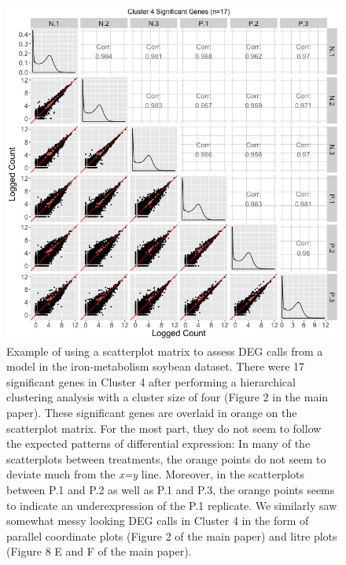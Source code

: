 \documentclass{article}
\begin{document}
  \clearpage
  \null
  \begin{figure}[t!]
  \centerline{\includegraphics[width=\columnwidth]{../MakeFigures/sbIRClusterSigSM4.jpg}}
  \caption{Example of using a scatterplot matrix to assess DEG calls from a model in the iron-metabolism soybean dataset. There were 17 significant genes in Cluster 4 after performing a hierarchical clustering analysis with a cluster size of four (Figure 2 in the main paper). These significant genes are overlaid in orange on the scatterplot matrix. For the most part, they do not seem to follow the expected patterns of differential expression: In many of the scatterplots between treatments, the orange points do not seem to deviate much from the \textit{x=y} line. Moreover, in the scatterplots between P.1 and P.2 as well as P.1 and P.3, the orange points seems to indicate an underexpression of the P.1 replicate. We similarly saw somewhat messy looking DEG calls in Cluster 4 in the form of parallel coordinate plots (Figure 2 of the main paper) and litre plots (Figure 8 E and F of the main paper).
  \label{sbIRClusterSigSM4}}
  \end{figure}  
  
\end{document}

